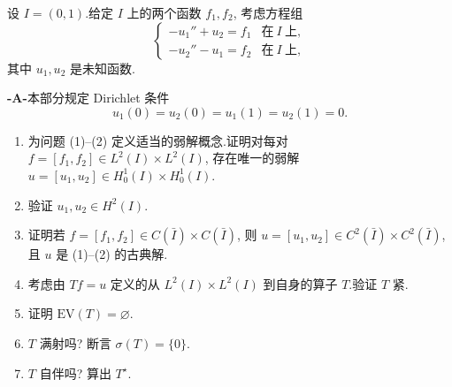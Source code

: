 \begin{exercise}
\label{exer:8.36}
设 $I=(0,1)$.给定 $I$ 上的两个函数 $f_1,f_2$, 考虑方程组
\begin{equation}
\begin{cases}
-u_1''+u_2=f_1 & \text{在}\ I\ \text{上},\\
-u_2''-u_1=f_2 & \text{在}\ I\ \text{上},
\end{cases}
\tag{1}
\end{equation}
其中 $u_1,u_2$ 是未知函数.

\noindent\textbf{-A-}\quad 本部分规定 Dirichlet 条件
\begin{equation}
u_1(0)=u_2(0)=u_1(1)=u_2(1)=0.
\tag{2}
\end{equation}
\begin{enumerate}[label=\arabic*., leftmargin=2.2em, itemsep=0.3em]
	\item 为问题 (1)--(2) 定义适当的弱解概念.证明对每对
	      $f=[f_1,f_2]\in L^2(I)\times L^2(I)$, 存在唯一的弱解
	      $u=[u_1,u_2]\in H_0^1(I)\times H_0^1(I)$.
	\item 验证 $u_1,u_2\in H^2(I)$.
	\item 证明若 $f=[f_1,f_2]\in C(\bar I)\times C(\bar I)$, 则
	      $u=[u_1,u_2]\in C^2(\bar I)\times C^2(\bar I)$, 且 $u$ 是
	      (1)--(2) 的古典解.
	\item 考虑由 $Tf=u$ 定义的从 $L^2(I)\times L^2(I)$ 到自身的算子
	      $T$.验证 $T$ 紧.
	\item 证明 $\mathrm{EV}(T)=\varnothing$.
	\item $T$ 满射吗? 断言 $\sigma(T)=\{0\}$.
	\item $T$ 自伴吗? 算出 $T^\star$.
\end{enumerate}


\end{exercise}
